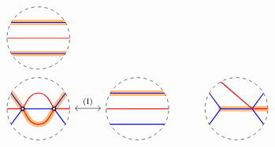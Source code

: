 \begin{figure}[ht]
\[\begin{tikzcd}[row sep=0pc]
\begin{tikzpicture}[baseline=-.5ex]
\draw [dashed] (3,0) circle [radius=1];%
\clip (3,0) circle (1);
\draw [color=cyclecolor1, line cap=round, line width=5, opacity=0.5] (2,1/2) to (4,1/2);
\draw [color=cyclecolor1, line cap=round, line width=5, opacity=0.5] (2,-1/2) to (4,-1/2);
\draw [blue, thick] ({3-sqrt(3)/2},1/2)--({3+sqrt(3)/2},1/2);
\draw [blue, thick] ({3-sqrt(3)/2},-1/2)--({3+sqrt(3)/2},-1/2);
\draw [red, thick] (2,0)--(4,0);
\end{tikzpicture}
\\
\begin{tikzpicture}[baseline=-.5ex]
\draw [dashed] (0,0) circle [radius=1];%
\clip (0,0) circle (1);
\draw [color=cyclecolor1, line cap=round, line width=5, opacity=0.5] ({-sqrt(3)/2},1/2)--(-1/2,0);
\draw [color=cyclecolor1, line cap=round, line width=5, opacity=0.5] (-1/2,0) to[out=-60,in=180] (0, -1/2) to[out=0, in=-120] (1/2,0); 
\draw [color=cyclecolor1, line cap=round, line width=5, opacity=0.5] ({sqrt(3)/2},1/2)--(1/2,0);
\draw [blue, thick] ({-sqrt(3)/2},1/2)--(-1/2,0);
\draw [blue, thick] ({-sqrt(3)/2},-1/2)--(-1/2,0);
\draw [blue, thick] ({sqrt(3)/2},1/2)--(1/2,0);
\draw [blue, thick] ({sqrt(3)/2},-1/2)--(1/2,0);
\draw [blue, thick] (-1/2,0)--(1/2,0);
\draw [red, thick] (-1,0)--(-1/2,0) to[out=60,in=180] (0,1/2) to[out=0,in=120] (1/2,0)--(1,0);
\draw [red, thick] (-1/2,0) to[out=-60,in=180] (0, -1/2) to[out=0, in=-120] (1/2,0); 
\draw[thick,black,fill=white] (-1/2,0) circle (0.05);
\draw[thick,black,fill=white] (1/2,0) circle (0.05);
\end{tikzpicture}
\arrow[leftrightarrow,r,"\Move{I}"]&
\begin{tikzpicture}[baseline=-.5ex]
\draw [dashed] (3,0) circle [radius=1];%
\clip (3,0) circle (1);
\draw [color=cyclecolor1, line cap=round, line width=5, opacity=0.5] ({3-sqrt(3)/2},1/2)--({3+sqrt(3)/2},1/2);
\draw [blue, thick] ({3-sqrt(3)/2},1/2)--({3+sqrt(3)/2},1/2);
\draw [blue, thick] ({3-sqrt(3)/2},-1/2)--({3+sqrt(3)/2},-1/2);
\draw [red, thick] (2,0)--(4,0);
\end{tikzpicture}
&
\begin{tikzpicture}[baseline=-.5ex]
\draw [dashed] (0,0) circle [radius=1];%
\clip (0,0) circle (1);
\draw [color=cyclecolor1, line cap=round, line width=5, opacity=0.5] (-1/2,0) to (1,0);
\draw [blue, thick] ({-sqrt(3)/2},1/2)--(-1/2,0);
\draw [blue, thick] ({-sqrt(3)/2},-1/2)--(-1/2,0);
\draw [blue, thick] ({sqrt(3)/2},1/2)--(1/2,0);
\draw [blue, thick] ({sqrt(3)/2},-1/2)--(1/2,0);
\draw [blue, thick] (-1/2,0)--(1/2,0);
\draw [red, thick] (-1/2,{sqrt(3)/2}) -- (1/2,0)--(1,0);

\end{tikzpicture}
\end{tikzcd}\]
\end{figure}
